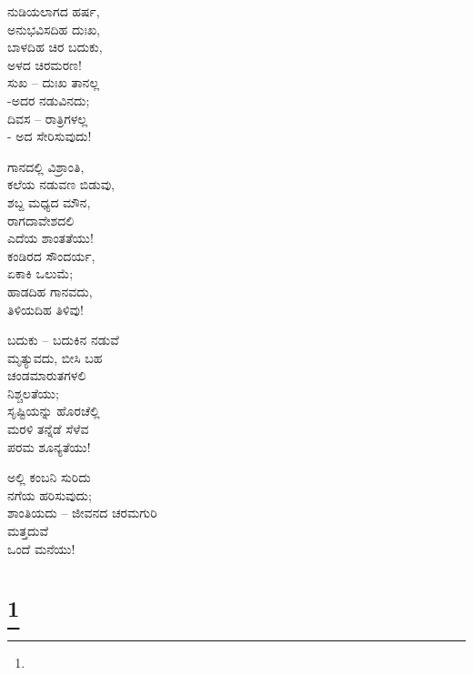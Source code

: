 \begin{myquote}
ನುಡಿಯಲಾಗದ ಹರ್ಷ,\\ಅನುಭವಿಸದಿಹ ದುಃಖ,\\ಬಾಳದಿಹ ಚಿರ ಬದುಕು,\\ಅಳದ ಚಿರಮರಣ!\\ಸುಖ – ದುಃಖ ತಾನಲ್ಲ\\-ಅದರ ನಡುವಿನದು;\\ದಿವಸ – ರಾತ್ರಿಗಳಲ್ಲ\\- ಅದ ಸೇರಿಸುವುದು!
\end{myquote}

\begin{myquote}
ಗಾನದಲ್ಲಿ ವಿಶ್ರಾಂತಿ,\\ಕಲೆಯ ನಡುವಣ ಬಿಡುವು,\\ಶಬ್ದ ಮಧ್ಯದ ಮೌನ,\\ರಾಗದಾವೇಶದಲಿ\\ಎದೆಯ ಶಾಂತತೆಯು!\\ಕಂಡಿರದ ಸೌಂದರ್ಯ,\\ಏಕಾಕಿ ಒಲುಮೆ;\\ಹಾಡದಿಹ ಗಾನವದು,\\ತಿಳಿಯದಿಹ ತಿಳಿವು!
\end{myquote}

\begin{myquote}
ಬದುಕು – ಬದುಕಿನ ನಡುವೆ\\ಮೃತ್ಯುವದು, ಬೀಸಿ ಬಹ\\ಚಂಡಮಾರುತಗಳಲಿ\\ನಿಶ್ಚಲತೆಯು;\\ಸೃಷ್ಟಿಯನ್ನು ಹೊರಚೆಲ್ಲಿ\\ಮರಳಿ ತನ್ನೆಡೆ ಸೆಳೆವ\\ಪರಮ ಶೂನ್ಯತೆಯು!
\end{myquote}

\begin{myquote}
ಅಲ್ಲಿ ಕಂಬನಿ ಸುರಿದು\\ನಗೆಯ ಹರಿಸುವುದು;\\ಶಾಂತಿಯದು – ಜೀವನದ ಚರಮಗುರಿ\\ಮತ್ತದುವೆ\\ಒಂದೆ ಮನೆಯು!
\end{myquote}

\selecteng

\chapter[ONE MORE CIRCLE]{\protect\footnote{}}

\begin{myquote}
\end{myquote}


